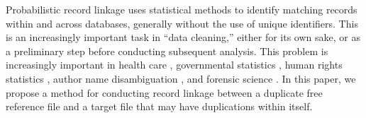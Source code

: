 \documentclass[12pt,letterpaper]{article}
\newcommand{\1}[1]{\mathbb{I}\!\left[#1\right]} %
\begin{document}


Probabilistic record linkage uses statistical methods to identify matching records within and across databases, generally without the use of unique identifiers. This is an increasingly important task in ``data cleaning,'' either for its own sake, or as a preliminary step before conducting subsequent analysis. This problem is increasingly important in health care \citep{gutman_bayesian_2013, hof2017probabilistic}, governmental statistics \citep{Jaro1995, Fortinietal01}, human rights statistics \citep{lum2013applications, price2015documents, Sadosky2015, sadinle_detecting_2014, sadinle_bayesian_2018}, author name disambiguation \citep{lai_2011, zhang2018name}, and forensic science \citep{Tai2019}. In this paper, we propose a method for conducting record linkage between a duplicate free reference file and a target file that may have duplications within itself.
\end{document}
